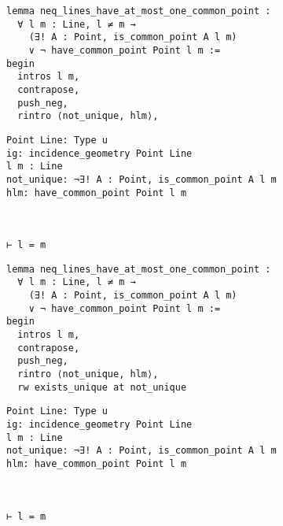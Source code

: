 \begin{frame}[fragile]
	\begin{multicols}{2}
		\begin{lstlisting}
lemma neq_lines_have_at_most_one_common_point :
  ∀ l m : Line, l ≠ m → 
    (∃! A : Point, is_common_point A l m) 
    ∨ ¬ have_common_point Point l m := 
begin
  intros l m,
  contrapose,
  push_neg,
  rintro ⟨not_unique, hlm⟩,
\end{lstlisting}
		\columnbreak
		\begin{lstlisting}
Point Line: Type u
ig: incidence_geometry Point Line
l m : Line
not_unique: ¬∃! A : Point, is_common_point A l m
hlm: have_common_point Point l m



⊢ l = m
		\end{lstlisting}
	\end{multicols}
\end{frame}










\begin{frame}[fragile]
	\begin{multicols}{2}
		\begin{lstlisting}
lemma neq_lines_have_at_most_one_common_point :
  ∀ l m : Line, l ≠ m → 
    (∃! A : Point, is_common_point A l m) 
    ∨ ¬ have_common_point Point l m := 
begin
  intros l m,
  contrapose,
  push_neg,
  rintro ⟨not_unique, hlm⟩,
  rw exists_unique at not_unique
\end{lstlisting}
		\columnbreak
		\begin{lstlisting}
Point Line: Type u
ig: incidence_geometry Point Line
l m : Line
not_unique: ¬∃! A : Point, is_common_point A l m
hlm: have_common_point Point l m



⊢ l = m
		\end{lstlisting}
	\end{multicols}
\end{frame}










